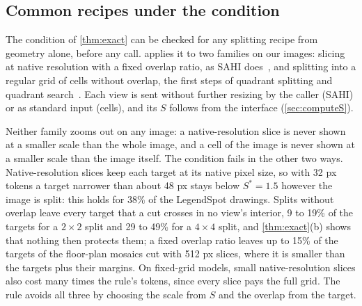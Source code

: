 \subsection{Common recipes under the condition}
\label{sec:recipes}

The condition of \cref{thm:exact} can be checked for any splitting recipe from geometry alone, before any call.  applies it to two families on our images: slicing at native resolution with a fixed overlap ratio, as SAHI does~\cite{akyon2022sahi}, and splitting into a regular grid of cells without overlap, the first steps of quadrant splitting and quadrant search~\cite{wang2025dc2,wu2024vstar,shen2024zoomeye}. Each view is sent without further resizing by the caller (SAHI) or as standard input (cells), and its $S$ follows from the interface (\cref{sec:computeS}).

Neither family zooms out on any image: a native-resolution slice is never shown at a smaller scale than the whole image, and a cell of the image is never shown at a smaller scale than the image itself. The condition fails in the other two ways. Native-resolution slices keep each target at its native pixel size, so with 32 px tokens a target narrower than about 48 px stays below $S^\ast = 1.5$ however the image is split: this holds for 38\% of the LegendSpot drawings. Splits without overlap leave every target that a cut crosses in no view's interior, 9 to 19\% of the targets for a $2 \times 2$ split and 29 to 49\% for a $4 \times 4$ split, and \cref{thm:exact}(b) shows that nothing then protects them; a fixed overlap ratio leaves up to 15\% of the targets of the floor-plan mosaics cut with 512 px slices, where it is smaller than the targets plus their margins. On fixed-grid models, small native-resolution slices also cost many times the rule's tokens, since every slice pays the full grid. The rule avoids all three by choosing the scale from $S$ and the overlap from the target.

